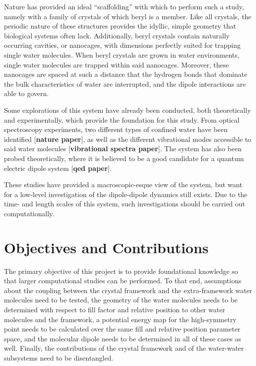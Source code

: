 Nature has provided an ideal “scaffolding” with which to perform such a study, namely with a family of crystals of which beryl is a member. Like all crystals, the periodic nature of these structures provides the idyllic, simple geometry that biological systems often lack. Additionally, beryl crystals contain naturally occurring cavities, or nanocages, with dimensions perfectly suited for trapping single water molecules. When beryl crystals are grown in water environments, single water molecules are trapped within said nanocages. Moreover, these nanocages are spaced at such a distance that the hydrogen bonds that dominate the bulk characteristics of water are interrupted, and the dipole interactions are able to govern.
 
Some explorations of this system have already been conducted, both theoretically and experimentally, which provide the foundation for this study. From optical spectroscopy experiments, two different types of confined water have been identified [\textbf{nature paper}], as well as the different vibrational modes accessible to said water molecules [\textbf{vibrational spectra paper}]. The system has also been probed theoretically, where it is believed to be a good candidate for a quantum electric dipole system [\textbf{qed paper}]. 

These studies have provided a macroscopic-esque view of the system, but want for a low-level investigation of the dipole-dipole dynamics still exists. Due to the time- and length scales of this system, such investigations should be carried out computationally.

\section{Objectives and Contributions}
\label{objectives}

The primary objective of this project is to provide foundational knowledge so that larger computational studies can be performed. To that end, assumptions about the coupling between the crystal framework and the extra-framework water molecules need to be tested, the geometry of the water molecules needs to be determined with respect to fill factor and relative position to other water molecules and the framework, a potential energy map for the high-symmetry point needs to be calculated over the same fill and relative position parameter space, and the molecular dipole needs to be determined in all of these cases as well. Finally, the contributions of the crystal framework and of the water-water subsystems need to be disentangled.

